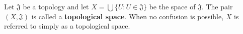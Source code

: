 Let $\mathfrak{J}$ be a topology and let $X = \bigcup \{U : U \in \mathfrak{J}\}$ be the space of $\mathfrak{J}$. The pair $(X, \mathfrak{J})$ is called a \textbf{topological space}. When no confusion is possible, $X$ is referred to simply as a topological space.
